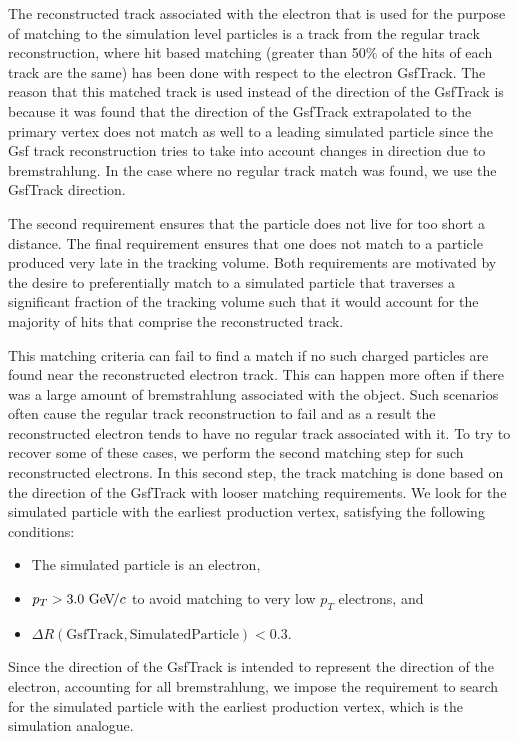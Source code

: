 \documentclass{cmspaper}
\begin{document}
The reconstructed track associated with the electron that is used for the purpose of matching to the simulation level particles is a track from the regular track reconstruction, where hit based matching (greater than 50\% of the hits of each track are the same) has been done with respect to the electron GsfTrack. The reason that this matched track is used instead of the direction of the GsfTrack is because it was found that the direction of the GsfTrack extrapolated to the primary vertex does not match as well to a leading simulated particle since the Gsf track reconstruction tries to take into account changes in direction due to bremstrahlung. In the case where no regular track match was found, we use the GsfTrack direction.

The second requirement ensures that the particle does not live for too short a distance. The final requirement ensures that one does not match to a particle produced very late in the tracking volume. Both requirements are motivated by the desire to preferentially match to a simulated particle that traverses a significant fraction of the tracking volume such that it would account for the majority of hits that comprise the reconstructed track. 

This matching criteria can fail to find a match if no such charged particles are found near the reconstructed electron track. This can happen more often if there was a large amount of bremstrahlung associated with the object. Such scenarios often cause the regular track reconstruction to fail and as a result the reconstructed electron tends to have no regular track associated with it. To try to recover some of these cases, we perform the second matching step for such reconstructed electrons. In this second step, the track matching is done based on the direction of the GsfTrack with looser matching requirements. We look for the simulated particle with the earliest production vertex, satisfying the following conditions:
\begin{itemize}
\item The simulated particle is an electron,
\item $p_T > 3.0~\mathrm{Ge\kern -0.1em V}\!/c$ to avoid matching to very low $p_T$ electrons, and
\item $\Delta R(\mathrm{ GsfTrack , Simulated Particle }) < 0.3$.
\end{itemize}

Since the direction of the GsfTrack is intended to represent the direction of the electron, accounting for all bremstrahlung, we impose the requirement to search for the simulated particle with the earliest production vertex, which is the simulation analogue. 
\end{document}
